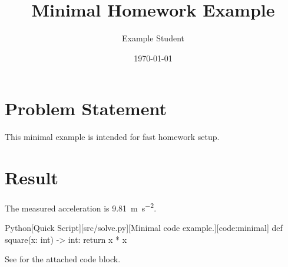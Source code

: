 \documentclass[titlepage=simple,code=listings]{../SUSTechHomework}
\title{Minimal Homework Example}
\author{Example Student}
\date{\today}
\begin{document}
\maketitle

\section{Problem Statement}

This minimal example is intended for fast homework setup.

\section{Result}

The measured acceleration is \qty{9.81}{\meter\per\second\squared}.

\begin{sustechcodeblock}{Python}[Quick Script][src/solve.py][Minimal code example.][code:minimal]
def square(x: int) -> int:
    return x * x
\end{sustechcodeblock}

See  for the attached code block.
\end{document}
